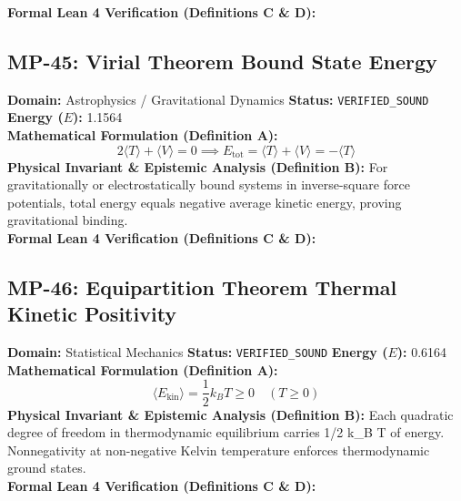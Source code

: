\textbf{Formal Lean 4 Verification (Definitions C \& D):}


\vspace{1em}
\subsection{MP-45: Virial Theorem Bound State Energy}
\textbf{Domain:} Astrophysics / Gravitational Dynamics \hfill \textbf{Status:} \texttt{VERIFIED\_SOUND} \hfill \textbf{Energy ($E$):} 1.1564\\
\textbf{Mathematical Formulation (Definition A):}
\begin{equation*}
2\langle T \rangle + \langle V \rangle = 0 \implies E_{\text{tot}} = \langle T \rangle + \langle V \rangle = -\langle T \rangle
\end{equation*}
\textbf{Physical Invariant \& Epistemic Analysis (Definition B):}
For gravitationally or electrostatically bound systems in inverse-square force potentials, total energy equals negative average kinetic energy, proving gravitational binding.\\

\textbf{Formal Lean 4 Verification (Definitions C \& D):}


\vspace{1em}
\subsection{MP-46: Equipartition Theorem Thermal Kinetic Positivity}
\textbf{Domain:} Statistical Mechanics \hfill \textbf{Status:} \texttt{VERIFIED\_SOUND} \hfill \textbf{Energy ($E$):} 0.6164\\
\textbf{Mathematical Formulation (Definition A):}
\begin{equation*}
\langle E_{\text{kin}} \rangle = \frac{1}{2} k_B T \ge 0 \quad (T \ge 0)
\end{equation*}
\textbf{Physical Invariant \& Epistemic Analysis (Definition B):}
Each quadratic degree of freedom in thermodynamic equilibrium carries 1/2 k\_B T of energy. Nonnegativity at non-negative Kelvin temperature enforces thermodynamic ground states.\\

\textbf{Formal Lean 4 Verification (Definitions C \& D):}


